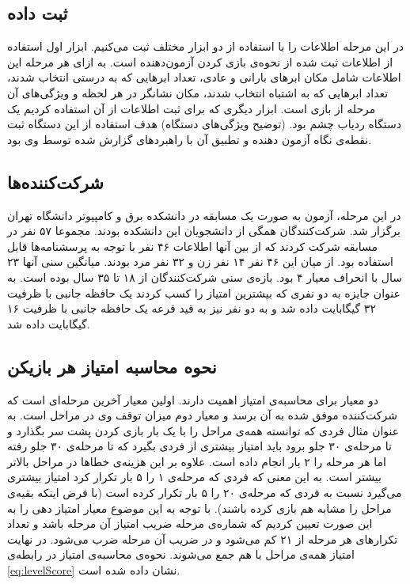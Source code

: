 \documentclass[twoside, a4paper,11pt]{book}
\numberwithin{equation}{chapter}
\numberwithin{table}{chapter}
\numberwithin{figure}{chapter}
\numberwithin{equation}{chapter}
\begin{document}
\subsection{ثبت داده}
در این مرحله اطلاعات را با استفاده از دو ابزار مختلف ثبت می‌کنیم. ابزار اول استفاده از اطلاعات ثبت شده از نحوه‌ی بازی کردن آزمون‌دهنده است. به ازای هر مرحله این اطلاعات شامل مکان ابرهای بارانی و عادی، تعداد ابرهایی که به درستی انتخاب شدند، تعداد ابرهایی که به اشتباه انتخاب شدند، مکان نشانگر در هر لحظه و ویژگی‌های آن مرحله از بازی است.
ابزار دیگری که برای ثبت اطلاعات از آن استفاده کردیم یک دستگاه ردیاب چشم بود. (توضیح ویژگی‌های دستگاه) هدف استفاده از این دستگاه ثبت نقطه‌ی نگاه آزمون دهنده و تطبیق آن با راهبرد‌های گزارش شده توسط وی بود.

\subsection{شرکت‌کننده‌ها}
در این مرحله، آزمون به صورت یک مسابقه در دانشکده برق و کامپیوتر دانشگاه تهران برگزار شد. شرکت‌کنندگان همگی از دانشجویان این دانشکده بودند. مجموعا ۵۷ نفر در مسابقه شرکت کردند که از بین آنها اطلاعات ۴۶ نفر با توجه به پرسشنامه‌ها قابل استفاده بود. از میان این ۴۶ نفر ۱۴ نفر زن و ۳۲ نفر مرد بودند. میانگین سنی آنها ۲۳ سال با انحراف معیار ۴ بود. بازه‌ی سنی شرکت‌کنندگان از ۱۸ تا ۳۵ سال بوده است. به عنوان جایزه به دو نفری که بیشترین امتیاز را کسب کردند یک حافظه جانبی با ظرفیت ۳۲ گیگابایت داده شد و به دو نفر نیز به قید قرعه یک حافظه جانبی با ظرفیت ۱۶ گیگابایت داده شد.

\subsection{نحوه محاسبه امتیاز هر بازیکن}
دو معیار برای محاسبه‌ی امتیاز اهمیت دارند. اولین معیار آخرین مرحله‌ای است که شرکت‌کننده موفق شده به آن برسد و معیار دوم میزان توقف وی در مراحل است. به عنوان مثال فردی که توانسته همه‌ی مراحل را با یک بار بازی کردن پشت سر بگذارد و تا مرحله‌ی ۳۰ جلو برود باید امتیاز بیشتری از فردی بگیرد که تا مرحله‌ی ۳۰ جلو رفته اما هر مرحله را ۲ بار انجام داده است.
علاوه بر این هزینه‌ی خطاها در مراحل بالاتر بیشتر است. به این معنی که فردی که مرحله‌ی ۱ را ۵ بار تکرار کرد امتیاز بیشتری می‌گیرد نسبت به فردی که مرحله‌ی ۲۰ را ۵ بار تکرار کرده است (با فرض اینکه بقیه‌ی مراحل را مشابه هم بازی کرده باشند).
با توجه به این موضوع معیار امتیاز دهی را به این صورت تعیین کردیم که شماره‌ی مرحله ضریب امتیاز آن مرحله باشد و تعداد تکرارهای هر مرحله از ۲۱ کم می‌شود و در ضریب آن مرحله ضرب می‌شود. در نهایت امتیاز همه‌ی مراحل با هم جمع می‌شوند. نحوه‌ی محاسبه‌ی امتیاز در رابطه‌ی \ref{eq:levelScore} نشان داده شده است.
\end{document}
